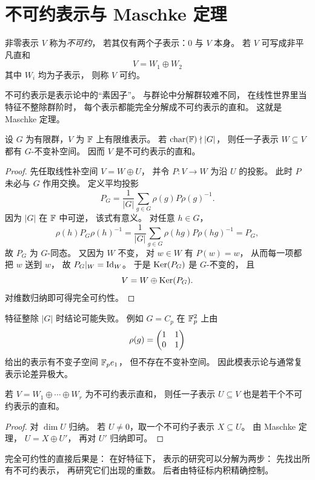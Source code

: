 \section{不可约表示与 Maschke 定理}
\begin{definition}
非零表示 $V$ 称为\emph{不可约}， 若其仅有两个子表示：$0$ 与 $V$ 本身。 若 $V$ 可写成非平凡直和
\[
V=W_1\oplus W_2
\]
其中 $W_i$ 均为子表示， 则称 $V$ 可约。
\end{definition}
不可约表示是表示论中的“素因子”。 与群论中分解群较难不同， 在线性世界里当特征不整除群阶时， 每个表示都能完全分解成不可约表示的直和。 这就是 Maschke 定理。
\begin{theorem}[Maschke]
设 $G$ 为有限群，$V$ 为 $\mathbb{F}$ 上有限维表示。 若 $\mathrm{char}(\mathbb{F})\nmid |G|$， 则任一子表示 $W\subseteq V$ 都有 $G$-不变补空间。 因而 $V$ 是不可约表示的直和。
\end{theorem}
\begin{proof}
先任取线性补空间 $V=W\oplus U$， 并令 $P:V\to W$ 为沿 $U$ 的投影。 此时 $P$ 未必与 $G$ 作用交换。 定义平均投影
\[
P_G=\frac1{|G|}\sum_{g\in G}\rho(g)P\rho(g)^{-1}.
\]
因为 $|G|$ 在 $\mathbb{F}$ 中可逆， 该式有意义。 对任意 $h\in G$，
\[
\rho(h)P_G\rho(h)^{-1}
=\frac1{|G|}\sum_{g\in G}\rho(hg)P\rho(hg)^{-1}=P_G,
\]
故 $P_G$ 为 $G$-同态。 又因为 $W$ 不变， 对 $w\in W$ 有 $P(w)=w$， 从而每一项都把 $w$ 送到 $w$， 故 $P_G|_W=\mathrm{Id}_W$。 于是 $\mathrm{Ker}(P_G)$ 是 $G$-不变的， 且
\[
V=W\oplus \mathrm{Ker}(P_G).
\]
对维数归纳即可得完全可约性。
\end{proof}
\begin{remark}
特征整除 $|G|$ 时结论可能失败。 例如 $G=C_p$ 在 $\mathbb{F}_p^2$ 上由
\[
\rho(g)=\begin{pmatrix} 1&1\\0&1 \end{pmatrix}
\]
给出的表示有不变子空间 $\mathbb{F}_p e_1$， 但不存在不变补空间。 因此模表示论与通常复表示论差异极大。
\end{remark}
\begin{proposition}
若 $V=W_1\oplus\cdots\oplus W_r$ 为不可约表示直和， 则任一子表示 $U\subseteq V$ 也是若干个不可约表示的直和。
\end{proposition}
\begin{proof}
对 $\dim U$ 归纳。 若 $U\neq 0$，取一个不可约子表示 $X\subseteq U$。 由 Maschke 定理， $U=X\oplus U'$， 再对 $U'$ 归纳即可。
\end{proof}
完全可约性的直接后果是： 在好特征下， 表示的研究可以分解为两步： 先找出所有不可约表示， 再研究它们出现的重数。 后者由特征标内积精确控制。
